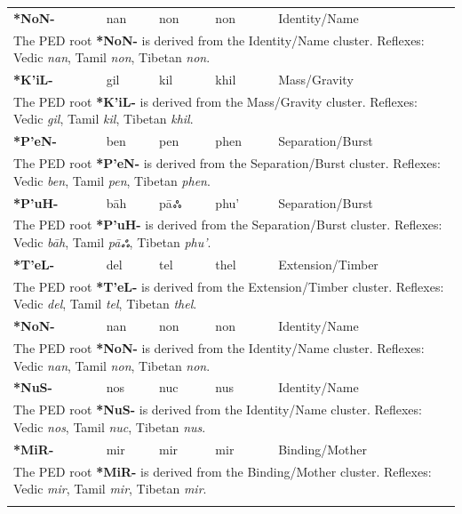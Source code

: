 \begin{longtable}{p{} p{} p{} p{} p{}}
\textbf{*NoN-} & nan & non & non & Identity/Name \\ 
\multicolumn{5}{p{\textwidth}}{\small The PED root \textbf{*NoN-} is derived from the Identity/Name cluster. Reflexes: Vedic \textit{nan}, Tamil \textit{non}, Tibetan \textit{non}. } \\ \addlinespace 
\textbf{*K'iL-} & gil & kil & khil & Mass/Gravity \\ 
\multicolumn{5}{p{\textwidth}}{\small The PED root \textbf{*K'iL-} is derived from the Mass/Gravity cluster. Reflexes: Vedic \textit{gil}, Tamil \textit{kil}, Tibetan \textit{khil}. } \\ \addlinespace 
\textbf{*P'eN-} & ben & pen & phen & Separation/Burst \\ 
\multicolumn{5}{p{\textwidth}}{\small The PED root \textbf{*P'eN-} is derived from the Separation/Burst cluster. Reflexes: Vedic \textit{ben}, Tamil \textit{pen}, Tibetan \textit{phen}. } \\ \addlinespace 
\textbf{*P'uH-} & bāh & pāஃ & phu' & Separation/Burst \\ 
\multicolumn{5}{p{\textwidth}}{\small The PED root \textbf{*P'uH-} is derived from the Separation/Burst cluster. Reflexes: Vedic \textit{bāh}, Tamil \textit{pāஃ}, Tibetan \textit{phu'}. } \\ \addlinespace 
\textbf{*T'eL-} & del & tel & thel & Extension/Timber \\ 
\multicolumn{5}{p{\textwidth}}{\small The PED root \textbf{*T'eL-} is derived from the Extension/Timber cluster. Reflexes: Vedic \textit{del}, Tamil \textit{tel}, Tibetan \textit{thel}. } \\ \addlinespace 
\textbf{*NoN-} & nan & non & non & Identity/Name \\ 
\multicolumn{5}{p{\textwidth}}{\small The PED root \textbf{*NoN-} is derived from the Identity/Name cluster. Reflexes: Vedic \textit{nan}, Tamil \textit{non}, Tibetan \textit{non}. } \\ \addlinespace 
\textbf{*NuS-} & nos & nuc & nus & Identity/Name \\ 
\multicolumn{5}{p{\textwidth}}{\small The PED root \textbf{*NuS-} is derived from the Identity/Name cluster. Reflexes: Vedic \textit{nos}, Tamil \textit{nuc}, Tibetan \textit{nus}. } \\ \addlinespace 
\textbf{*MiR-} & mir & mir & mir & Binding/Mother \\ 
\multicolumn{5}{p{\textwidth}}{\small The PED root \textbf{*MiR-} is derived from the Binding/Mother cluster. Reflexes: Vedic \textit{mir}, Tamil \textit{mir}, Tibetan \textit{mir}. } \\ \addlinespace 

\end{longtable}
